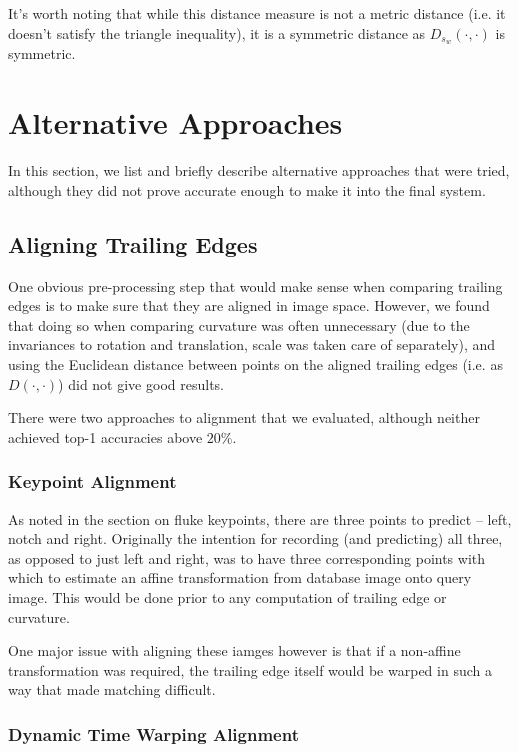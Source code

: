 It's worth noting that while this distance measure is not a metric distance (i.e. it doesn't satisfy the triangle inequality), it is a symmetric distance as $D_{s_w}(\cdot,\cdot)$ is symmetric\cite{muller2007information}.

\section{Alternative Approaches}

In this section, we list and briefly describe alternative approaches that were tried, although they did not prove accurate enough to make it into the final system.

\subsection{Aligning Trailing Edges}

One obvious pre-processing step that would make sense when comparing trailing edges is to make sure that they are aligned in image space.
However, we found that doing so when comparing curvature was often unnecessary (due to the invariances to rotation and translation, scale was taken care of separately), and using the Euclidean distance between points on the aligned trailing edges (i.e. as $D(\cdot,\cdot)$) did not give good results.

There were two approaches to alignment that we evaluated, although neither achieved top-1 accuracies above $20\%$.

\subsubsection{Keypoint Alignment}

As noted in the section on fluke keypoints, there are three points to predict -- left, notch and right.
Originally the intention for recording (and predicting) all three, as opposed to just left and right, was to have three corresponding points with which to estimate an affine transformation from database image onto query image.
This would be done prior to any computation of trailing edge or curvature.

One major issue with aligning these iamges however is that if a non-affine transformation was required, the trailing edge itself would be warped in such a way that made matching difficult.

\subsubsection{Dynamic Time Warping Alignment}

